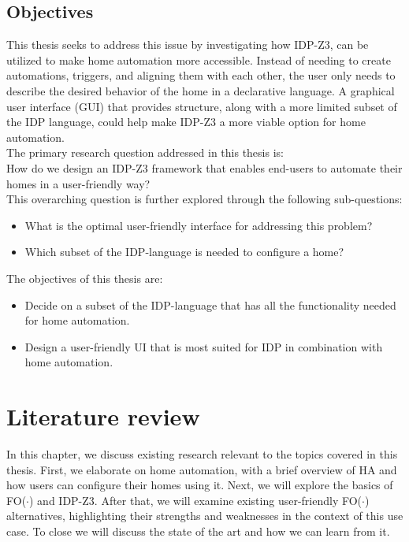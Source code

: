 \documentclass[11pt,a4paper]{report}
\newcommand{\fodot}{FO($\cdot$)\xspace}
\begin{document}
\section{Objectives}
This thesis seeks to address this issue by investigating how IDP-Z3, can be utilized to make home automation more accessible. Instead of needing to create automations, triggers, and aligning them with each other, the user only needs to describe the desired behavior of the home in a declarative language. A graphical user interface (GUI) that provides structure, along with a more limited subset of the IDP language, could help make IDP-Z3 a more viable option for home automation.\\
The primary research question addressed in this thesis is:\\
How do we design an IDP-Z3 framework that enables end-users to automate their homes in a user-friendly way?\\
This overarching question is further explored through the following sub-questions:
\begin{itemize}
    \item What is the optimal user-friendly interface for addressing this problem?
    \item Which subset of the IDP-language is needed to configure a home?
\end{itemize}
The objectives of this thesis are:
\begin{itemize}
    \item Decide on a subset of the IDP-language that has all the functionality needed for home automation.
    \item Design a user-friendly UI that is most suited for IDP in combination with home automation.
\end{itemize}





\chapter{Literature review}
In this chapter, we discuss existing research relevant to the topics covered in this thesis. First, we elaborate on home automation, with a brief overview of HA and how users can configure their homes using it. Next, we will explore the basics of \fodot and IDP-Z3. After that, we will examine existing user-friendly \fodot alternatives, highlighting their strengths and weaknesses in the context of this use case. To close we will discuss the state of the art and how we can learn from it.
\end{document}
